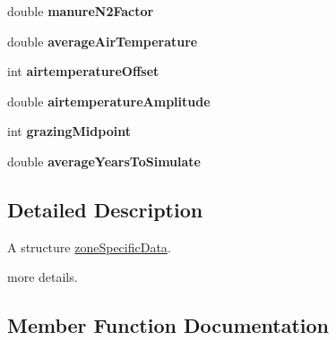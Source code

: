 \begin{DoxyCompactItemize}
\mbox{\label{struct_global_vars_1_1zone_specific_data_aceacb6c7ed874764debf6de75c556c24}} 
double {\bfseries manure\+N2\+Factor}
\item 
\mbox{\label{struct_global_vars_1_1zone_specific_data_a1530185dd9893076c63b683b0c510d21}} 
double {\bfseries average\+Air\+Temperature}
\item 
\mbox{\label{struct_global_vars_1_1zone_specific_data_a458403ecc171acb0626aa861f74bf99f}} 
int {\bfseries airtemperature\+Offset}
\item 
\mbox{\label{struct_global_vars_1_1zone_specific_data_a79cfc4b11a43b0388af3475111fb1423}} 
double {\bfseries airtemperature\+Amplitude}
\item 
\mbox{\label{struct_global_vars_1_1zone_specific_data_a048a804055beb52f6f9946f3f772effb}} 
int {\bfseries grazing\+Midpoint}
\item 
\mbox{\label{struct_global_vars_1_1zone_specific_data_aa50a0df9db21a036993caeb0d1c819a0}} 
double {\bfseries average\+Years\+To\+Simulate}
\end{DoxyCompactItemize}


\subsection{Detailed Description}
A structure \mbox{\hyperlink{struct_global_vars_1_1zone_specific_data}{zone\+Specific\+Data}}. 

more details. 

\subsection{Member Function Documentation}
\mbox{\label{struct_global_vars_1_1zone_specific_data_aca3aef5da8c090939b0184077cee32fb}} 
